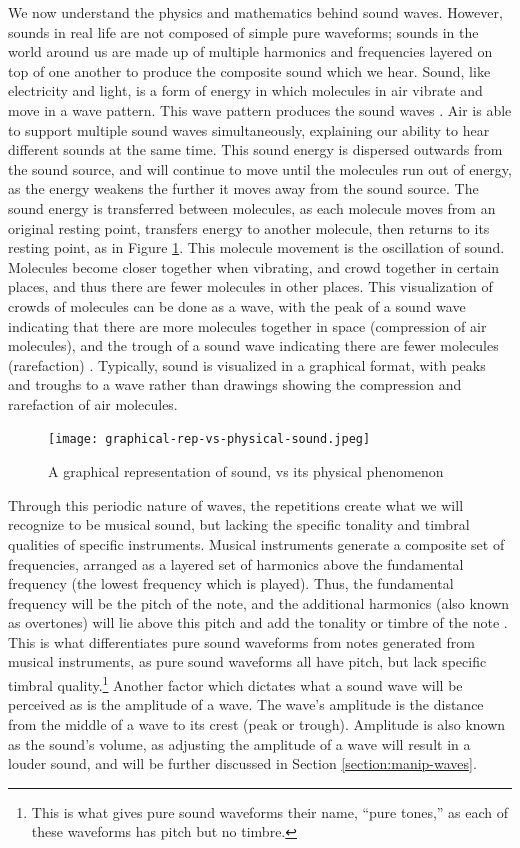 We now understand the physics and mathematics behind sound waves. However, sounds in real life are not composed of simple pure waveforms; sounds in the world around us are made up of multiple harmonics and frequencies layered on top of one another to produce the composite sound which we hear. Sound, like electricity and light, is a form of energy in which molecules in air vibrate and move in a wave pattern. This wave pattern produces the sound waves \cite{Au-Yeung_2021}. Air is able to support multiple sound waves simultaneously, explaining our ability to hear different sounds at the same time. This sound energy is dispersed outwards from the sound source, and will continue to move until the molecules run out of energy, as the energy weakens the further it moves away from the sound source. The sound energy is transferred between molecules, as each molecule moves from an original resting point, transfers energy to another molecule, then returns to its resting point, as in Figure \ref{fig:graphical-rep-vs-physical-sound}. This molecule movement is the oscillation of sound. Molecules become closer together when vibrating, and crowd together in certain places, and thus there are fewer molecules in other places. This visualization of crowds of molecules can be done as a wave, with the peak of a sound wave indicating that there are more molecules together in space (compression of air molecules), and the trough of a sound wave indicating there are fewer molecules (rarefaction) \cite{Toft_2020}. Typically, sound is visualized in a graphical format, with peaks and troughs to a wave rather than drawings showing the compression and rarefaction of air molecules. 

\begin{figure}
  \centering
  \texttt{[image: graphical-rep-vs-physical-sound.jpeg]}
  \caption{A graphical representation of sound, vs its physical phenomenon}\cite{Toft_2020}
  \label{fig:graphical-rep-vs-physical-sound}
\end{figure}

Through this periodic nature of waves, the repetitions create what we will recognize to be musical sound, but lacking the specific tonality and timbral qualities of specific instruments. Musical instruments generate a composite set of frequencies, arranged as a layered set of harmonics above the fundamental frequency (the lowest frequency which is played). Thus, the fundamental frequency will be the pitch of the note, and the additional harmonics (also known as overtones) will lie above this pitch and add the tonality or timbre of the note \cite{Toft_2020}. This is what differentiates pure sound waveforms from notes generated from musical instruments, as pure sound waveforms all have pitch, but lack specific timbral quality.\footnote{This is what gives pure sound waveforms their name, ``pure tones,'' as each of these waveforms has pitch but no timbre.} Another factor which dictates what a sound wave will be perceived as is the amplitude of a wave. The wave's amplitude is the distance from the middle of a wave to its crest (peak or trough). Amplitude is also known as the sound's volume, as adjusting the amplitude of a wave will result in a louder sound, and will be further discussed in Section \ref{section:manip-waves}.

